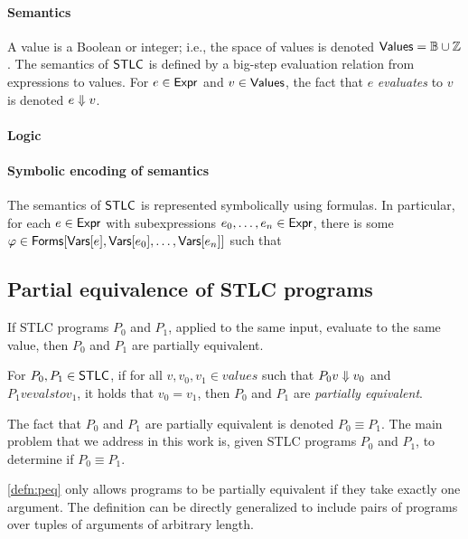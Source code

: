 \paragraph{Semantics}
%
A value is a Boolean or integer;
%
i.e., the space of values is denoted $\mathsf{Values} = \mathbb{B} \cup \mathbb{Z}$.
%
The semantics of $\mathsf{STLC}$ is defined by a big-step evaluation relation
from expressions to values.
%
For $e \in \mathsf{Expr}$ and $v \in \mathsf{Values}$, the fact that $e$
\emph{evaluates} to $v$ is denoted $e \Downarrow v$.


\paragraph{Logic}
%

\paragraph{Symbolic encoding of semantics}
%
The semantics of $\mathsf{STLC}$ is represented symbolically using \lia
formulas.
%
%
In particular, for each $e \in \mathsf{Expr}$ with subexpressions $e_0,
\ldots, e_n \in \mathsf{Expr}$, there is some $\varphi \in \mathsf{Forms}[ \mathsf{Vars}[e],
  \mathsf{Vars}[e_0], \ldots, \mathsf{Vars}[e_n] ]$ such that


\subsection{Partial equivalence of STLC programs}
\label{sec:peq}
%
If STLC programs $P_0$ and $P_1$, applied to the same input, evaluate
to the same value, then $P_0$ and $P_1$ are partially equivalent.
%
\begin{defn}
  \label{defn:peq}
  For $P_0, P_1 \in \mathsf{STLC}$, if for all $v, v_0, v_1 \in values$ such
  that $P_0 v \Downarrow v_0$ and $P_1 v evalsto v_1$, it holds that
  $v_0 = v_1$, then $P_0$ and $P_1$ are \emph{partially equivalent}.
\end{defn}
%
The fact that $P_0$ and $P_1$ are partially equivalent is denoted $P_0
\equiv P_1$.
%
The main problem that we address in this work is, given STLC programs
$P_0$ and $P_1$, to determine if $P_0 \equiv P_1$.

\autoref{defn:peq} only allows programs to be partially equivalent if
they take exactly one argument.
%
The definition can be directly generalized to include pairs of
programs over tuples of arguments of arbitrary length.


